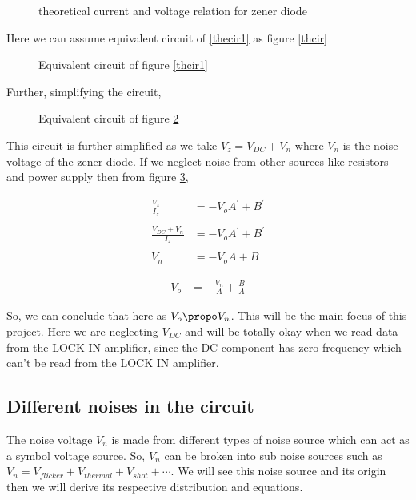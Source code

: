 \documentclass[draft,12pt]{article}
\begin{document}
\begin{figure}[hbt!]
\caption{theoretical current and voltage relation for zener diode \label{thiv}}
\end{figure}


Here we can assume equivalent circuit of \ref{thecir1} as figure \ref{thcir} 

\begin{figure}[hbt!]
\caption{Equivalent circuit of figure \ref{thcir1} \label{thcir2}}
\end{figure}

Further, simplifying the circuit,

\begin{figure}[hbt!]
\caption{Equivalent circuit of figure \ref{thcir2} \label{thcir3}}
\end{figure}

This circuit is further simplified as we take $V_z = V_{DC} + V_n$ where $V_n$ is the noise voltage of the zener diode.
If we neglect noise from other sources like resistors and power supply then from figure \ref{thcir3},

\begin{align*}
\frac{V_z}{I_z} & = -V_oA^{\prime} +B^{\prime}\\
  \\
\frac{V_{DC}+V_n}{I_z} & =  -V_oA^{\prime} +B^{\prime}\\
\\  
V_n & = -V_oA+B
\end{align*}


\begin{align} \label{vo}
V_o & = -\frac{V_n}{A}+\frac{B}{A}
\end{align}



So, we can conclude that here as $V_o \propo V_n$.  This will be the main focus of this project. Here we are neglecting $V_{DC}$ and will be totally okay when we read data from the LOCK IN amplifier, since the DC component has zero frequency which can’t be read from the LOCK IN amplifier.

\subsection{Different noises in the circuit \label{thno}}

The noise voltage $V_n$ is made from different types of noise source which can act as a symbol voltage source. So, $V_n$ can be broken into sub noise sources such as $V_n = V_{flicker}+V_{thermal} + V_{shot} +\cdots$. We will see this noise source and its origin then we will derive its respective distribution and equations.
\end{document}
